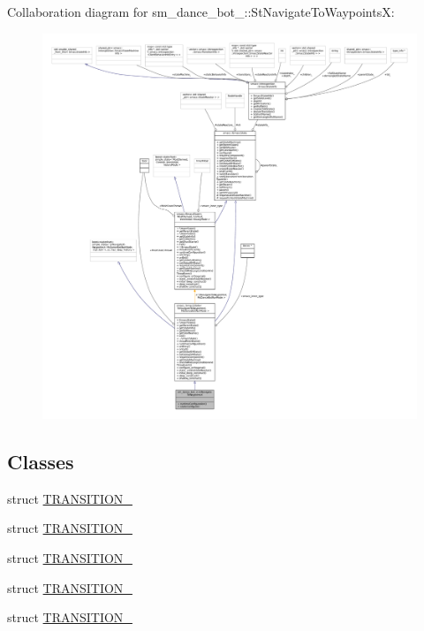 Collaboration diagram for sm\+\_\+dance\+\_\+bot\+\_\+:\+:St\+Navigate\+To\+WaypointsX\+:
\nopagebreak
\begin{figure}[H]
\begin{center}
\leavevmode
\includegraphics[width=350pt]{structsm__dance__bot__3_1_1StNavigateToWaypointsX__coll__graph}
\end{center}
\end{figure}
\subsection*{Classes}
\begin{DoxyCompactItemize}
\item 
struct \hyperlink{structsm__dance__bot__3_1_1StNavigateToWaypointsX_1_1TRANSITION__1}{T\+R\+A\+N\+S\+I\+T\+I\+O\+N\+\_}
\item 
struct \hyperlink{structsm__dance__bot__3_1_1StNavigateToWaypointsX_1_1TRANSITION__2}{T\+R\+A\+N\+S\+I\+T\+I\+O\+N\+\_}
\item 
struct \hyperlink{structsm__dance__bot__3_1_1StNavigateToWaypointsX_1_1TRANSITION__3}{T\+R\+A\+N\+S\+I\+T\+I\+O\+N\+\_}
\item 
struct \hyperlink{structsm__dance__bot__3_1_1StNavigateToWaypointsX_1_1TRANSITION__4}{T\+R\+A\+N\+S\+I\+T\+I\+O\+N\+\_}
\item 
struct \hyperlink{structsm__dance__bot__3_1_1StNavigateToWaypointsX_1_1TRANSITION__5}{T\+R\+A\+N\+S\+I\+T\+I\+O\+N\+\_}
\end{DoxyCompactItemize}
